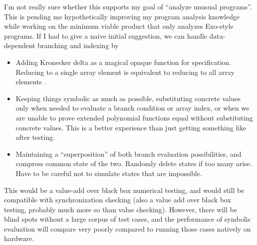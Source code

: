 I'm not really sure whether this supports my goal of ``analyze unusual programs''.
This is pending me hypothetically improving my program analysis knowledge while working on the minimum viable product that only analyzes Exo-style programs.
If I had to give a naive initial suggestion, we can handle data-dependent branching and indexing by
\begin{itemize}
  \item Adding Kronecker delta as a magical opaque function for specification.
    Reducing to a single array element  is equivalent to reducing to all array elements .
  \item Keeping things symbolic as much as possible, substituting concrete values only when needed to evaluate a branch condition or array index, or when we are unable to prove extended polynomial functions equal without substituting concrete values. This is a better experience than just getting something like  after testing.
  \item Maintaining a ``superposition'' of both branch evaluation possibilities, and compress common state of the two.
    Randomly delete states if too many arise.
    Have to be careful not to simulate states that are impossible.
\end{itemize}
This would be a value-add over black box numerical testing, and would still be compatible with synchronization checking (also a value add over black box testing, probably much more so than value checking).
However, there will be blind spots without a large corpus of test cases, and the performance of symbolic evaluation will compare very poorly compared to running those cases natively on hardware.
